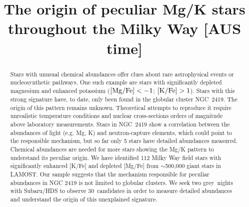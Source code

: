 \documentclass{article}
\begin{document}
\newcommand{\todo}[1]{\ul{\MakeUppercase{\textbf{#1}}}}
\newcommand{\NumStars}{30}
\newcommand{\NumNights}{two grey}
\semester{}
\proposalid{}
\receivedate{}


\title{The origin of peculiar Mg/K stars throughout the Milky Way [AUS time] }


\NormalStars

\begin{abstract}
Stars with unusual chemical abundances offer clues about rare astrophysical events or nucleosynthetic pathways. One such example are stars with significantly depleted magnesium and enhanced potassium ($[{\rm Mg/Fe}] < -1$; $[{\rm K/Fe}] > 1$). Stars with this strong signature have, to date, only been found in the globular cluster NGC~2419. The origin of this pattern remains unknown. Theoretical attempts to reproduce it require unrealistic temperature conditions and nuclear cross-sections orders of magnitude above laboratory measurements. Stars in NGC~2419 show a correlation between the abundances of light (e.g. Mg, K) and neutron-capture elements, which could point to the responsible mechanism, but so far only 5 stars have detailed abundances measured. Chemical abundances are needed for more stars showing the Mg/K pattern to understand its peculiar origin. We have identified 112 Milky Way field stars with significantly enhanced [K/Fe] and depleted [Mg/Fe] from $\sim$500,000 giant stars in LAMOST. Our sample suggests that the mechanism responsible for peculiar abundances in NGC 2419 is not limited to globular clusters. We seek \NumNights\ nights with Subaru/HDS to observe \NumStars\ candidates in order to measure detailed abundances and understand the origin of this unexplained signature.
\end{abstract}
\end{document}
